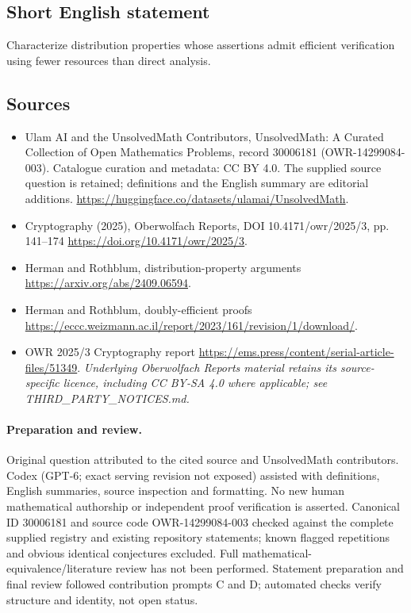 \documentclass[11pt]{article}
\begin{document}
\subsection{Short English statement}
Characterize distribution properties whose assertions admit efficient verification using fewer resources than direct analysis.
\subsection{Sources}
\begin{itemize}
\item[\hypertarget{source:30006181:1}{S1}] Ulam AI and the UnsolvedMath Contributors, UnsolvedMath: A Curated Collection of Open Mathematics Problems, record 30006181 (OWR-14299084-003). Catalogue curation and metadata: CC BY 4.0. The supplied source question is retained; definitions and the English summary are editorial additions.
\url{https://huggingface.co/datasets/ulamai/UnsolvedMath}.
\item[\hypertarget{source:30006181:2}{S2}] Cryptography (2025), Oberwolfach Reports, DOI 10.4171/owr/2025/3, pp. 141--174
\url{https://doi.org/10.4171/owr/2025/3}.
\item[\hypertarget{source:30006181:3}{S3}] Herman and Rothblum, distribution-property arguments
\url{https://arxiv.org/abs/2409.06594}.
\item[\hypertarget{source:30006181:4}{S4}] Herman and Rothblum, doubly-efficient proofs
\url{https://eccc.weizmann.ac.il/report/2023/161/revision/1/download/}.
\item[\hypertarget{source:30006181:5}{S5}] OWR 2025/3 Cryptography report
\url{https://ems.press/content/serial-article-files/51349}.
\textit{Underlying Oberwolfach Reports material retains its source-specific licence, including CC BY-SA 4.0 where applicable; see THIRD\_PARTY\_NOTICES.md.}
\end{itemize}
\paragraph{Preparation and review.}
Original question attributed to the cited source and UnsolvedMath contributors. Codex (GPT-6; exact serving revision not exposed) assisted with definitions, English summaries, source inspection and formatting. No new human mathematical authorship or independent proof verification is asserted. Canonical ID 30006181 and source code OWR-14299084-003 checked against the complete supplied registry and existing repository statements; known flagged repetitions and obvious identical conjectures excluded. Full mathematical-equivalence/literature review has not been performed. Statement preparation and final review followed contribution prompts C and D; automated checks verify structure and identity, not open status.
\label{end:30006181}
\end{document}
